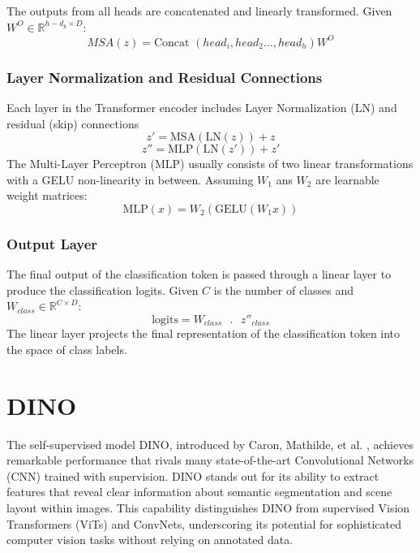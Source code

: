 The outputs from all heads are concatenated and linearly transformed. Given \(W^O \in \mathbb{R}^{h-d_k \times D } \):
\begin{equation}
	MSA(z) = \text{Concat  }(head_i, head_2..., head_h)W^O
\end{equation}

\subsubsection{Layer Normalization and Residual Connections}
Each layer in the Transformer encoder includes Layer Normalization (LN) and residual (skip) connections
\begin{equation}
	z' = \text{MSA}(\text{LN}(z)) + z
\end{equation}
\begin{equation}
	z'' = \text{MLP}(\text{LN}(z')) + z'
\end{equation}
The Multi-Layer Perceptron (MLP) usually consists of two linear transformations with a GELU non-linearity in between. Assuming \(W_1\) ans \(W_2\) are learnable weight matrices:
\begin{equation}
	\text{MLP}(x) = W_2(\text{GELU}(W_1x))
\end{equation}

\subsubsection{Output Layer}
The final output of the classification token is passed through a linear layer to produce the classification logits. Given \(C\) is the number of classes and \(W_{class} \in \mathbb{R}^{C \times D }\):
\begin{equation}
	\text{logits} = W_{class} \text{ }.\text{ } z''_{class}
\end{equation}
The linear layer projects the final representation of the classification token into the space of class labels.

\section{DINO}
The self-supervised model DINO, introduced by Caron, Mathilde, et al. \cite{caron2021emerging}, achieves remarkable performance that rivals many state-of-the-art Convolutional Networks (CNN) trained with supervision. DINO stands out for its ability to extract features that reveal clear information about semantic segmentation and scene layout within images. This capability distinguishes DINO from supervised Vision Transformers (ViTs) and ConvNets, underscoring its potential for sophisticated computer vision tasks without relying on annotated data.

